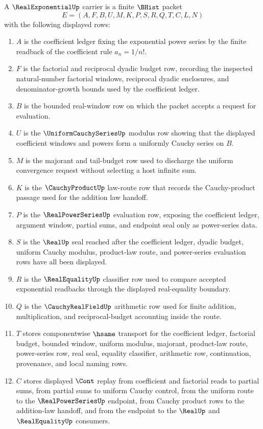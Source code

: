 \begin{definition}\label{def:real-exponential-carrier}
A $\RealExponentialUp$ carrier is a finite $\BHist$ packet
$$
E=(A,F,B,U,M,K,P,S,R,Q,T,C,L,N)
$$
with the following displayed rows:
\begin{enumerate}
\item $A$ is the coefficient ledger fixing the exponential power series by the finite readback of the coefficient rule $a_n=1/n!$.
\item $F$ is the factorial and reciprocal dyadic budget row, recording the inspected natural-number factorial windows, reciprocal dyadic enclosures, and denominator-growth bounds used by the coefficient ledger.
\item $B$ is the bounded real-window row on which the packet accepts a request for evaluation.
\item $U$ is the $\UniformCauchySeriesUp$ modulus row showing that the displayed coefficient windows and powers form a uniformly Cauchy series on $B$.
\item $M$ is the majorant and tail-budget row used to discharge the uniform convergence request without selecting a host infinite sum.
\item $K$ is the $\CauchyProductUp$ law-route row that records the Cauchy-product passage used for the addition law handoff.
\item $P$ is the $\RealPowerSeriesUp$ evaluation row, exposing the coefficient ledger, argument window, partial sums, and endpoint seal only as power-series data.
\item $S$ is the $\RealUp$ seal reached after the coefficient ledger, dyadic budget, uniform Cauchy modulus, product-law route, and power-series evaluation rows have all been displayed.
\item $R$ is the $\RealEqualityUp$ classifier row used to compare accepted exponential readbacks through the displayed real-equality boundary.
\item $Q$ is the $\CauchyRealFieldUp$ arithmetic row used for finite addition, multiplication, and reciprocal-budget accounting inside the route.
\item $T$ stores componentwise $\hsame$ transport for the coefficient ledger, factorial budget, bounded window, uniform modulus, majorant, product-law route, power-series row, real seal, equality classifier, arithmetic row, continuation, provenance, and local naming rows.
\item $C$ stores displayed $\Cont$ replay from coefficient and factorial reads to partial sums, from partial sums to uniform Cauchy control, from the uniform route to the $\RealPowerSeriesUp$ endpoint, from Cauchy product rows to the addition-law handoff, and from the endpoint to the $\RealUp$ and $\RealEqualityUp$ consumers.

\end{enumerate}
\end{definition}
